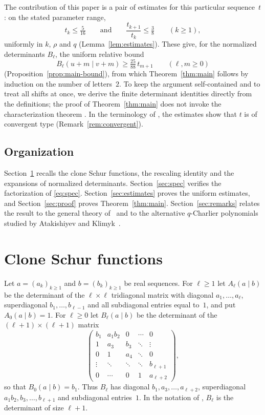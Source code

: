 \documentclass[11pt]{amsart}
\theoremstyle{definition}
\theoremstyle{remark}
\numberwithin{equation}{section}
\begin{document}
The contribution of this paper is a pair of estimates for this particular sequence~$t$: on the stated parameter range,
\[
t_k\le \tfrac{5}{16}\qquad\text{and}\qquad \frac{t_{k+1}}{t_k}\le\tfrac38\qquad(k\ge1),
\]
uniformly in $k$, $\rho$ and $q$ (Lemma~\ref{lem:estimates}). These give, for the normalized determinants $B_\ell$, the uniform relative bound
\[
B_\ell(u+m\mid v+m)\ge \tfrac{25}{88}\,t_{m+1}\qquad(\ell,m\ge0)
\]
(Proposition~\ref{prop:main-bound}), from which Theorem~\ref{thm:main} follows by induction on the number of letters~$2$. To keep the argument self-contained and to treat all shifts at once, we derive the finite determinant identities directly from the definitions; the proof of Theorem~\ref{thm:main} does not invoke the characterization theorem \cite[Theorem~4.12]{PS26}. In the terminology of \cite[Definition~4.6]{PS26}, the estimates show that $t$ is of convergent type (Remark~\ref{rem:convergent}).

\subsection*{Organization}
Section~\ref{sec:prelim} recalls the clone Schur functions, the rescaling identity and the expansions of normalized determinants. Section~\ref{sec:spec} verifies the factorization of \eqref{eq:spec}. Section~\ref{sec:estimates} proves the uniform estimates, and Section~\ref{sec:proof} proves Theorem~\ref{thm:main}. Section~\ref{sec:remarks} relates the result to the general theory of~\cite{PS26} and to the alternative $q$-Charlier polynomials studied by Atakishiyev and Klimyk~\cite{AK03}.

\section{Clone Schur functions}\label{sec:prelim}

Let $a=(a_k)_{k\ge1}$ and $b=(b_k)_{k\ge1}$ be real sequences. For $\ell\ge1$ let $A_\ell(a\mid b)$ be the determinant of the $\ell\times\ell$ tridiagonal matrix with diagonal $a_1,\dots,a_\ell$, superdiagonal $b_1,\dots,b_{\ell-1}$ and all subdiagonal entries equal to~$1$, and put $A_0(a\mid b)=1$. For $\ell\ge0$ let $B_\ell(a\mid b)$ be the determinant of the $(\ell+1)\times(\ell+1)$ matrix
\[
\begin{pmatrix}
b_1 & a_1b_2 & 0 & \cdots & 0\\
1 & a_3 & b_3 & \ddots & \vdots\\
0 & 1 & a_4 & \ddots & 0\\
\vdots & \ddots & \ddots & \ddots & b_{\ell+1}\\
0 & \cdots & 0 & 1 & a_{\ell+2}
\end{pmatrix},
\]
so that $B_0(a\mid b)=b_1$. Thus $B_\ell$ has diagonal $b_1,a_3,\dots,a_{\ell+2}$, superdiagonal $a_1b_2,b_3,\dots,b_{\ell+1}$ and subdiagonal entries~$1$. In the notation of \cite[(2.10)]{PS26}, $B_\ell$ is the determinant of size $\ell+1$.
\end{document}
